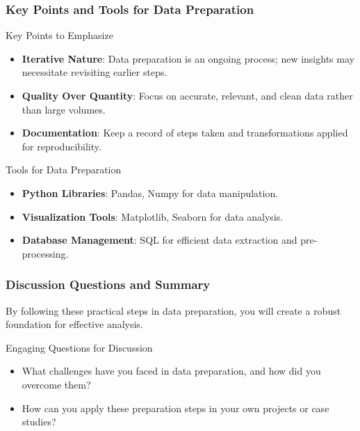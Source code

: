 \documentclass[aspectratio=169]{beamer}
\begin{document}
\begin{frame}[fragile]
    \frametitle{Key Points and Tools for Data Preparation}
    \begin{block}{Key Points to Emphasize}
        \begin{itemize}
            \item \textbf{Iterative Nature}: Data preparation is an ongoing process; new insights may necessitate revisiting earlier steps.
            \item \textbf{Quality Over Quantity}: Focus on accurate, relevant, and clean data rather than large volumes.
            \item \textbf{Documentation}: Keep a record of steps taken and transformations applied for reproducibility.
        \end{itemize}
    \end{block}

    \begin{block}{Tools for Data Preparation}
        \begin{itemize}
            \item \textbf{Python Libraries}: Pandas, Numpy for data manipulation.
            \item \textbf{Visualization Tools}: Matplotlib, Seaborn for data analysis.
            \item \textbf{Database Management}: SQL for efficient data extraction and pre-processing.
        \end{itemize}
    \end{block}
\end{frame}

\begin{frame}[fragile]
    \frametitle{Discussion Questions and Summary}
    By following these practical steps in data preparation, you will create a robust foundation for effective analysis. 

    \begin{block}{Engaging Questions for Discussion}
        \begin{itemize}
            \item What challenges have you faced in data preparation, and how did you overcome them?
            \item How can you apply these preparation steps in your own projects or case studies?
        \end{itemize}
    \end{block}
\end{frame}
\end{document}

